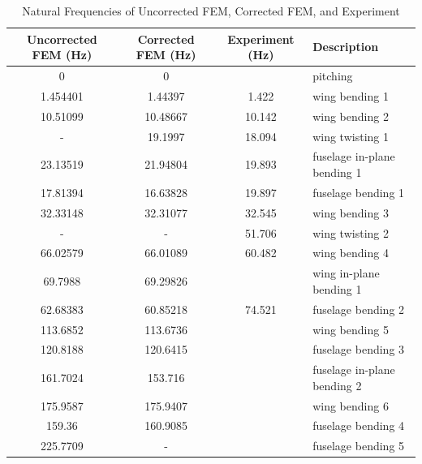 \begin{table}[h]
	\centering
	\caption{Natural Frequencies of Uncorrected FEM, Corrected FEM, and Experiment}
	\label{tab:gvtCompare}
	\begin{tabular}{cccl}
		\hline\hline
		Uncorrected FEM (Hz) & Corrected FEM (Hz) & Experiment (Hz) & Description \\
		\hline
        0 & 0 &  & pitching \\
		1.454401 & 1.44397 & 1.422 & wing bending 1 \\
        10.51099 & 10.48667 & 10.142 & wing bending 2 \\
        - & 19.1997 & 18.094 & wing twisting 1 \\
        23.13519 & 21.94804 & 19.893 & fuselage in-plane bending 1 \\
        17.81394 & 16.63828 & 19.897 & fuselage bending 1 \\
        32.33148 & 32.31077 & 32.545 & wing bending 3 \\
        - & - & 51.706 & wing twisting 2 \\
        66.02579 & 66.01089 & 60.482 & wing bending 4 \\
        69.7988 & 69.29826 & & wing in-plane bending 1 \\
        62.68383 & 60.85218 & 74.521 & fuselage bending 2 \\
        113.6852 & 113.6736 & & wing bending 5 \\
        120.8188 & 120.6415 & & fuselage bending 3 \\
        161.7024 & 153.716 & & fuselage in-plane bending 2 \\
        175.9587 & 175.9407 & & wing bending 6 \\
        159.36 & 160.9085 & & fuselage bending 4 \\
        225.7709 & - & & fuselage bending 5 \\
		\hline\hline
	\end{tabular}
\end{table}